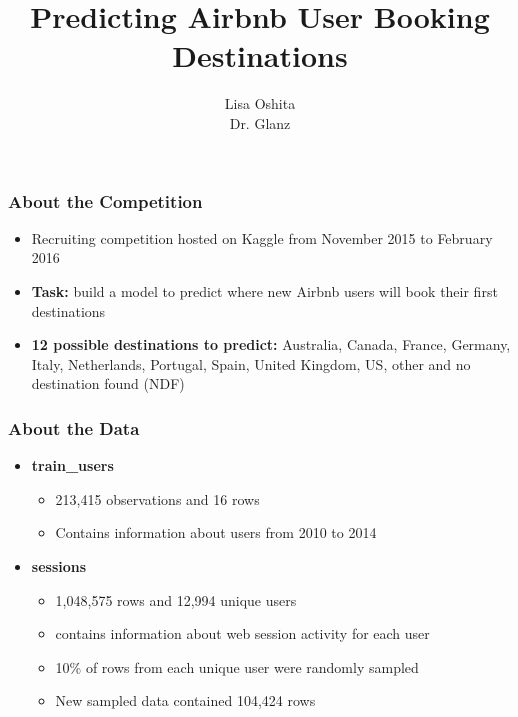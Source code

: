 \documentclass{beamer}
\title{Predicting Airbnb User Booking Destinations}
\author{Lisa Oshita\\Dr. Glanz}
\begin{document}
 
\frame{\titlepage}

\begin{frame}
\frametitle{About the Competition}
  \begin{itemize}
    \item Recruiting competition hosted on Kaggle from November 2015 to February 2016 \vspace{1ex}
    \item \textbf{Task:} build a model to predict where new Airbnb users will book their first destinations \vspace{1ex}
    \item \textbf{12 possible destinations to predict:} Australia, Canada, France, Germany, Italy, Netherlands, Portugal, Spain, United Kingdom, US, other and no destination found (NDF)
  \end{itemize}
\end{frame}

\begin{frame}
\frametitle{About the Data}
\begin{itemize}
  \item \textbf{train\_users} 
  \begin{itemize}
    \item 213,415 observations and 16 rows
    \item Contains information about users from 2010 to 2014 \vspace{2ex}
  \end{itemize}
  \item \textbf{sessions}
  \begin{itemize}
    \item 1,048,575 rows and 12,994 unique users
    \item contains information about web session activity for each user
    \item 10\% of rows from each unique user were randomly sampled
    \item New sampled data contained 104,424 rows  
  \end{itemize}
\end{itemize}
\end{frame}
\end{document}
